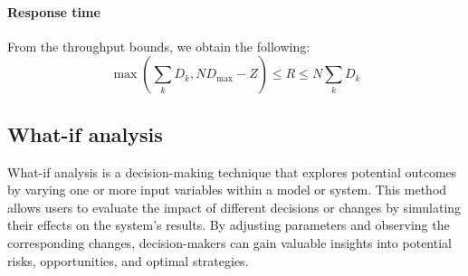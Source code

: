 \paragraph*{Response time}
From the throughput bounds, we obtain the following:
\[\max\left(\sum_kD_k, ND_{\max}-Z\right)\leq R \leq N\sum_kD_k\]

\subsection{What-if analysis}
What-if analysis is a decision-making technique that explores potential outcomes by varying one or more input variables within a model or system. 
This method allows users to evaluate the impact of different decisions or changes by simulating their effects on the system's results. 
By adjusting parameters and observing the corresponding changes, decision-makers can gain valuable insights into potential risks, opportunities, and optimal strategies.